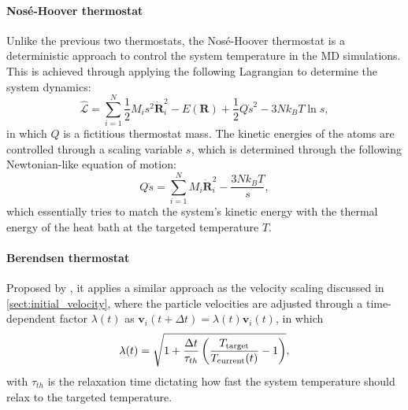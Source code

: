 \paragraph{\textbf{Nos\'{e}-Hoover thermostat}} Unlike the previous two thermostats, the Nos\'{e}-Hoover thermostat\cite{nose1984unified,hoover1985canonical} is a deterministic approach to control the system temperature in the MD simulations. This is achieved through applying the following Lagrangian to determine the system dynamics:
\begin{equation}
    \label{eq:NH_lagrangian}
    \hat{\mathcal{L}}=\sum_{i=1}^{N}\frac{1}{2}M_is^2\dot{\bm{R}}_i^2-E(\bm{R})+\frac{1}{2}Q\dot{s}^2-3N k_B T\ln s,
\end{equation}
in which $Q$ is a fictitious thermostat mass. The kinetic energies of the atoms are controlled through a scaling variable $s$, which is determined through the following Newtonian-like equation of motion:
\begin{equation}
    \label{eq:NH_KE_control}
Q\ddot{s}=\sum_{i=1}^{N}M_i\dot{\bm{R}}_i^2-\frac{3Nk_B T}{s},
\end{equation}
which essentially tries to match the system's kinetic energy with the thermal energy of the heat bath at the targeted temperature $T$.

\paragraph{\textbf{Berendsen thermostat}} Proposed by \citet{berendsen1984molecular}, it applies a similar approach as the velocity scaling discussed in \cref{sect:initial_velocity}, where the particle velocities are adjusted through a time-dependent factor $\lambda(t)$ as $\bm{v}_{i}(t+\Delta t)=\lambda(t)\bm{v}_i(t)$, in which 
\begin{equation}
    \label{eq:berendsen_lambda}
    \lambda(t)=\sqrt{1+\frac{\Delta t}{\tau_{th}}\left(\frac{T_{\mbox{\scriptsize{target}}}}{T_{\mbox{\scriptsize{current}}}(t)}-1\right)},
\end{equation}
with $\tau_{th}$ is the relaxation time dictating how fast the system temperature should relax to the targeted temperature.

